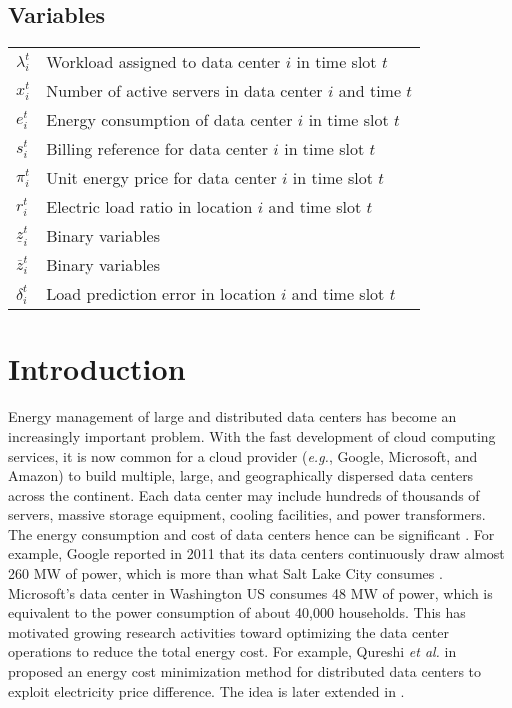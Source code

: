 \documentclass[journal]{IEEEtran}
\begin{document}
\subsection*{Variables}
\begin{tabular}{l l} $\lambda_{i}^{t}$ &Workload assigned to data center $i$ in time slot $t$\\
	$x_{i}^{t}$ &Number of active servers in data center $i$ and time $t$\\ 
	$e_{i}^{t}$ &Energy consumption of data center $i$ in time slot $t$\\ 
	$s_{i}^{t}$ &Billing reference for data center $i$ in time slot $t$\\ 
	$\pi_{i}^{t}$ &Unit energy price for data center $i$ in time slot $t$\\
	$r_{i}^{t}$ &Electric load ratio in location $i$ and time slot $t$\\
	$\underline{z}_{i}^{t}$ &Binary variables \\
	$\overline{z}_{i}^{t}$ &Binary variables \\
	$\delta_{i}^{t}$ &Load prediction error in location $i$ and time slot $t$
\end{tabular}


	\section{Introduction}
	Energy management of large and distributed data centers has become an increasingly important problem. With the fast development of cloud computing services, it is now common for a cloud provider (\textit{e.g.}, Google, Microsoft, and Amazon) to build multiple, large, and geographically dispersed data centers across the continent. Each data center may include hundreds of thousands of servers, massive storage equipment, cooling facilities, and power transformers. The energy consumption and cost of data centers hence can be significant \cite{sigcomm}. For example, Google reported in 2011 that its data centers continuously draw almost 260 MW of power, which is more than what Salt Lake City consumes \cite{google}. Microsoft's data center in Washington US consumes 48 MW of power, which is equivalent to the power consumption of about 40,000 households. This has motivated growing research activities toward optimizing the data center operations to reduce the total energy cost. For example, Qureshi \emph{et al.} in \cite{sigcomm} proposed an energy cost minimization method for distributed data centers to exploit electricity price difference. The idea is later extended in \cite{infocom,sigmetrics,online,SLA,price,Auction,tradeoff}.
	
\end{document}
